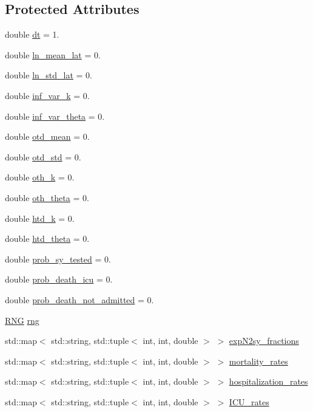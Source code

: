 \subsection*{Protected Attributes}
\begin{DoxyCompactItemize}
\item 
double \hyperlink{classInfection_a63da4cdd4a61a3dfd683b9bdb4bd349f}{dt} = 1.
\item 
double \hyperlink{classInfection_ae449cd434a9d7f733c68479aec82220c}{ln\+\_\+mean\+\_\+lat} = 0.
\item 
double \hyperlink{classInfection_ac5fdf055075ad79087962316d6159b54}{ln\+\_\+std\+\_\+lat} = 0.
\item 
double \hyperlink{classInfection_a9f0349a023149c77cded0aaa16acbe9a}{inf\+\_\+var\+\_\+k} = 0.
\item 
double \hyperlink{classInfection_aeefba628b7e0c52c681278913d2e93d9}{inf\+\_\+var\+\_\+theta} = 0.
\item 
double \hyperlink{classInfection_ad54183621f0ec00d7cfdbfc5894f8851}{otd\+\_\+mean} = 0.
\item 
double \hyperlink{classInfection_aff153254edc238db5c597f83888a1cc0}{otd\+\_\+std} = 0.
\item 
double \hyperlink{classInfection_af1c916b3c3c695d3eb6ce4ac7fc5ea5a}{oth\+\_\+k} = 0.
\item 
double \hyperlink{classInfection_a2ff9fb76061e4256492075600c37908b}{oth\+\_\+theta} = 0.
\item 
double \hyperlink{classInfection_ae1cf283dc6ab0a72433e7c05e85d21f3}{htd\+\_\+k} = 0.
\item 
double \hyperlink{classInfection_afa6f7f026abed10b1617ecb93e902197}{htd\+\_\+theta} = 0.
\item 
double \hyperlink{classInfection_acdbf7c2f72b0ab0938bec8de1ca4e24c}{prob\+\_\+sy\+\_\+tested} = 0.
\item 
double \hyperlink{classInfection_a6e3b8effa79cb442b32e0e0bc186b999}{prob\+\_\+death\+\_\+icu} = 0.
\item 
double \hyperlink{classInfection_a2214fd2ee8e17f049ccb15fc8f9635db}{prob\+\_\+death\+\_\+not\+\_\+admitted} = 0.
\item 
\hyperlink{classRNG}{R\+NG} \hyperlink{classInfection_af3737374c3cf12f7d0e78bdd8d95a7d5}{rng}
\item 
std\+::map$<$ std\+::string, std\+::tuple$<$ int, int, double $>$ $>$ \hyperlink{classInfection_a07fc3fe0299522acd9b017d297e63bbc}{exp\+N2sy\+\_\+fractions}
\item 
std\+::map$<$ std\+::string, std\+::tuple$<$ int, int, double $>$ $>$ \hyperlink{classInfection_a0450bef9ca4de3f11b29ed1a34af9c8d}{mortality\+\_\+rates}
\item 
std\+::map$<$ std\+::string, std\+::tuple$<$ int, int, double $>$ $>$ \hyperlink{classInfection_a792a83867418c7ce251b30a5fe6493fd}{hospitalization\+\_\+rates}
\item 
std\+::map$<$ std\+::string, std\+::tuple$<$ int, int, double $>$ $>$ \hyperlink{classInfection_ac1caeca6e2801b1d56ab26f8842625b0}{I\+C\+U\+\_\+rates}
\end{DoxyCompactItemize}


